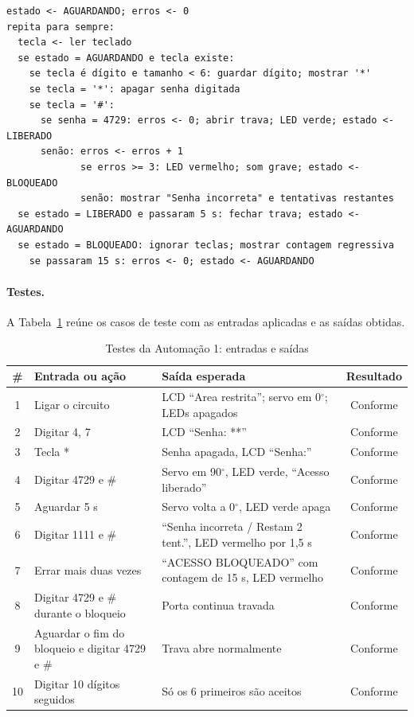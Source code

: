 \documentclass[12pt]{article}
\newcommand{\conf}{Conforme}
\begin{document}
\begin{lstlisting}[style=pseudo]
estado <- AGUARDANDO; erros <- 0
repita para sempre:
  tecla <- ler teclado
  se estado = AGUARDANDO e tecla existe:
    se tecla é dígito e tamanho < 6: guardar dígito; mostrar '*'
    se tecla = '*': apagar senha digitada
    se tecla = '#':
      se senha = 4729: erros <- 0; abrir trava; LED verde; estado <- LIBERADO
      senão: erros <- erros + 1
             se erros >= 3: LED vermelho; som grave; estado <- BLOQUEADO
             senão: mostrar "Senha incorreta" e tentativas restantes
  se estado = LIBERADO e passaram 5 s: fechar trava; estado <- AGUARDANDO
  se estado = BLOQUEADO: ignorar teclas; mostrar contagem regressiva
    se passaram 15 s: erros <- 0; estado <- AGUARDANDO
\end{lstlisting}

\paragraph{Testes.} A Tabela~\ref{tab:teste1} reúne os casos de teste com as entradas aplicadas e as saídas obtidas.

\begin{table}[!htb]
\centering
\caption{Testes da Automação 1: entradas e saídas}\label{tab:teste1}
\small
\begin{tabularx}{\textwidth}{cXXc}
\toprule
\# & Entrada ou ação & Saída esperada & Resultado \\
\midrule
1 & Ligar o circuito & LCD ``Area restrita''; servo em 0$^\circ$; LEDs apagados & \conf \\
2 & Digitar 4, 7 & LCD ``Senha: **'' & \conf \\
3 & Tecla * & Senha apagada, LCD ``Senha:'' & \conf \\
4 & Digitar 4729 e \# & Servo em 90$^\circ$, LED verde, ``Acesso liberado'' & \conf \\
5 & Aguardar 5 s & Servo volta a 0$^\circ$, LED verde apaga & \conf \\
6 & Digitar 1111 e \# & ``Senha incorreta / Restam 2 tent.'', LED vermelho por 1,5 s & \conf \\
7 & Errar mais duas vezes & ``ACESSO BLOQUEADO'' com contagem de 15 s, LED vermelho & \conf \\
8 & Digitar 4729 e \# durante o bloqueio & Porta continua travada & \conf \\
9 & Aguardar o fim do bloqueio e digitar 4729 e \# & Trava abre normalmente & \conf \\
10 & Digitar 10 dígitos seguidos & Só os 6 primeiros são aceitos & \conf \\
\bottomrule
\end{tabularx}
\end{table}
\end{document}
